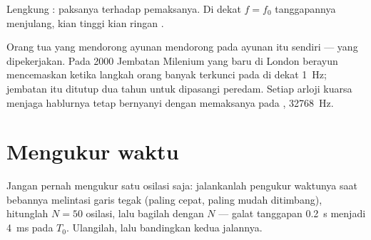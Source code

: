 \begin{omfigure}

{\small Lengkung :  paksanya terhadap  pemaksanya.
Di dekat $f = f_0$ tanggapannya menjulang, kian tinggi kian ringan .}
\end{omfigure}

\begin{example}\label{ex:g12:oscillators-and-time:resonance-zoo}
Orang tua yang mendorong ayunan mendorong pada  ayunan itu sendiri
---  yang dipekerjakan. Pada \num{2000} Jembatan Milenium yang baru
di London berayun mencemaskan ketika langkah orang banyak terkunci pada
 di dekat \qty{1}{Hz}; jembatan itu ditutup dua tahun untuk
dipasangi peredam. Setiap arloji kuarsa menjaga hablurnya tetap bernyanyi
dengan memaksanya pada , \qty{32768}{Hz}.
\end{example}

\section{Mengukur waktu}

\begin{method}\label{met:g12:oscillators-and-time:timing}
Jangan pernah mengukur satu osilasi saja: jalankanlah pengukur waktunya saat
bebannya melintasi garis tegak (paling cepat, paling mudah ditimbang),
hitunglah $N = 50$ osilasi, lalu bagilah dengan $N$ --- galat tanggapan
\qty{0.2}{s} menjadi \qty{4}{ms} pada $T_0$. Ulangilah, lalu bandingkan
kedua jalannya.
\end{method}

